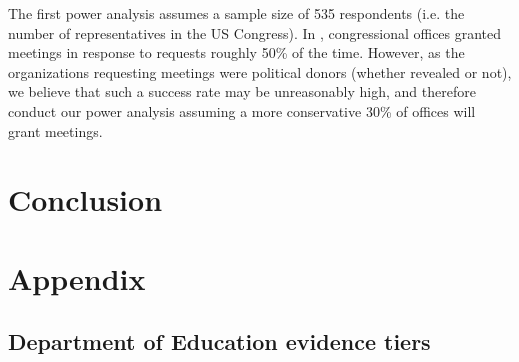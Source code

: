 \documentclass[12pt,final,fleqn]{article}
\theoremstyle{plain}
\begin{document}
The first power analysis assumes a sample size of 535 respondents (i.e. the number of representatives in the US Congress). In \citet{kalla2016campaign}, congressional offices granted meetings in response to requests roughly 50\% of the time. However, as the organizations requesting meetings were political donors (whether revealed or not), we believe that such a success rate may be unreasonably high, and therefore conduct our power analysis assuming a more conservative 30\% of offices will grant meetings.


\section{Conclusion} \label{sec:Conclusion}


\clearpage
\pagebreak


\pagebreak

\appendix
\setcounter{table}{0}
\setcounter{figure}{0}
\renewcommand\thetable{\Alph{section}.\arabic{table}}
\renewcommand\thefigure{\Alph{section}.\arabic{figure}}
\section{Appendix} \label{Appendix}

\subsection{Department of Education evidence tiers} \label{sec: DoE}
\end{document}
